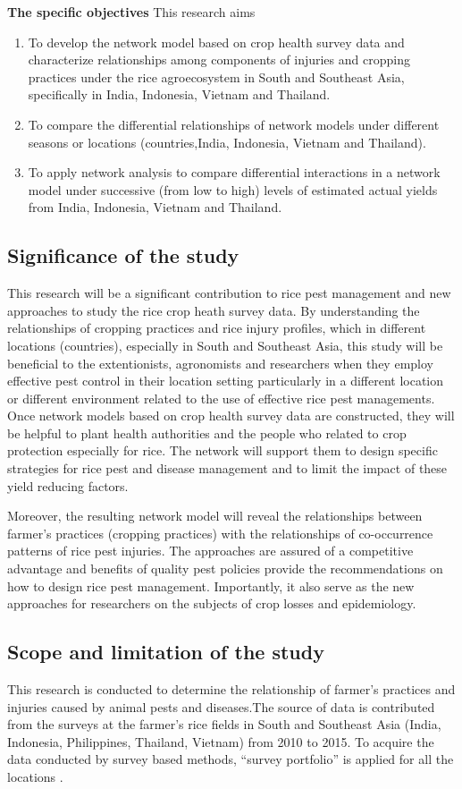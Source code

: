 \textbf{The specific objectives}
This research aims 
\begin{enumerate}
\item To develop the network model based on crop health survey data and characterize relationships among components of injuries and cropping practices under the rice agroecosystem in South and Southeast Asia, specifically in India, Indonesia, Vietnam and Thailand.
\item To compare the differential relationships of network models under different seasons or locations (countries,India, Indonesia, Vietnam and Thailand). 
\item To apply network analysis to compare differential interactions in a network model under successive (from low to high) levels of estimated actual yields from India, Indonesia, Vietnam and Thailand.
\end{enumerate}

\subsection{Significance of the study}

This research will be a significant contribution to rice pest management and  new approaches to study the rice crop heath survey data. By understanding the relationships of cropping practices and rice injury profiles, which in different locations (countries), especially in South and Southeast Asia, this study will be beneficial to the extentionists, agronomists and researchers when they employ effective pest control in their location setting particularly in a different location or different environment related to the use of effective rice pest managements. Once network models based on crop health survey data are constructed, they will be helpful to plant health authorities and the people who related to crop protection especially for rice. The network will support them to design specific strategies for rice pest and disease management and to limit the impact of these yield reducing factors.

Moreover, the resulting network model will reveal the relationships between farmer's practices (cropping practices) with the relationships of co-occurrence patterns of rice pest injuries. The approaches are assured of a competitive advantage and benefits of quality pest policies provide the recommendations on how to design rice pest management. Importantly, it also serve as the new approaches for researchers on the subjects of crop losses  and epidemiology.

\subsection{Scope and limitation of the study}

This research is conducted to determine the relationship of farmer's practices and injuries caused by animal pests and diseases.The source of data is contributed from the surveys at the farmer's rice fields in South and Southeast Asia (India, Indonesia, Philippines, Thailand, Vietnam) from 2010 to 2015. To acquire the data conducted by survey based methods, ``survey portfolio'' is applied for all the locations \citep{Savary_2009_Survey}.
